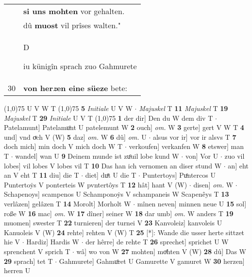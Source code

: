 \documentclass[8pt,a4paper,notitlepage]{article}
\begin{document}
\begin{table}[ht]
\begin{minipage}[t]{0.5\linewidth}
\begin{tabular}{rl}
 & \textbf{si uns mohten} vor gehalten.\\ 
 & dû \textbf{muost} vil prîses walten."\\ 
 & \begin{large}D\end{large}iu künigîn sprach zuo Gahmurete\\ 
30 & \textbf{von her\textit{z}en eine süeze} bete:\\ 
\end{tabular}
\scriptsize
\line(1,0){75} \newline
U V W T \newline
\line(1,0){75} \newline
\textbf{5} \textit{Initiale} U V W   $\cdot$ \textit{Majuskel} T  \textbf{11} \textit{Majuskel} T  \textbf{19} \textit{Majuskel} T  \textbf{29} \textit{Initiale} U V T  \newline
\line(1,0){75} \newline
\textbf{1} der dir] Den du W dem div T  $\cdot$ Patelamunt] Patelamuͦnt U patelemunt W \textbf{2} ouch] \textit{om.} W \textbf{3} gerte] gert V W T \textbf{4} und] vnd oͮch V (W) \textbf{5} daz] \textit{om.} W \textbf{6} dû] \textit{om.} U  $\cdot$ alsus vor ir] vor ir alsvs T \textbf{7} doch mich] min doch V mich doch W T  $\cdot$ verkoufen] verkanfen W \textbf{8} etswer] man T  $\cdot$ wandel] wan U \textbf{9} Deinem munde ist zuͦuil lobe kund W  $\cdot$ von] Vor U  $\cdot$ zuo vil lobes] vil lobes V lobes vil T \textbf{10} Das han ich vernomen an diser stund W  $\cdot$ an] eht an V eht T \textbf{11} diu] die T  $\cdot$ diet] duͦt U die T  $\cdot$ Puntertoys] Puͦntercos U Puntertoẏs V ponterteis W pvntertôys T \textbf{12} hât] hant V (W)  $\cdot$ disen] \textit{om.} W  $\cdot$ Schapenoys] scampenos U Schamponoẏs V schampaneis W Scapenêys T \textbf{13} verlâzen] gelâzen T \textbf{14} Morolt] Morholt W  $\cdot$ mînen neven] minnen neue U \textbf{15} sol] roße W \textbf{16} mac] \textit{om.} W \textbf{17} dîner] seiner W \textbf{18} dar umb] \textit{om.} W anders T \textbf{19} muomen] swester T \textbf{22} turnieren] der turnei V \textbf{23} Kanvoleiz] kanvoleis U Kanuoleis V (W) \textbf{24} rehte] rehten V (W) T \textbf{25} [*]: Wande die usser herte sittzet hie V  $\cdot$ Hardiz] Hardis W  $\cdot$ der hêrre] de rehte T \textbf{26} sprechet] sprichet U W sprenchent V sprich T  $\cdot$ wâ] wo von W \textbf{27} mohten] moͤhten V (W) \textbf{28} dû] Das W \textbf{29} sprach] tet T  $\cdot$ Gahmurete] Gahmuͦret U Gamurette V gamuret W \textbf{30} herzen] herren U \newline
\end{minipage}
\end{table}
\end{document}
